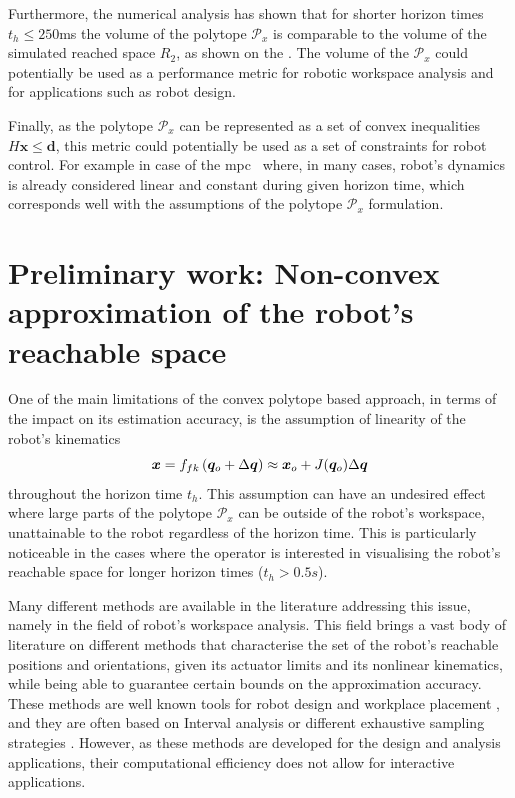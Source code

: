 Furthermore, the numerical analysis has shown that for shorter horizon times $t_h\leq250$ms the volume of the polytope $\mathcal{P}_x$ is comparable to the volume of the simulated reached space $R_2$, as shown on the . The volume of the $\mathcal{P}_x$ could potentially be used as a performance metric for robotic workspace analysis and for applications such as robot design.

Finally, as the polytope $\mathcal{P}_x$ can be represented as a set of convex inequalities $H\bm{x}\leq\bm{d}$, this metric could potentially be used as a set of constraints for robot control. For example in case of the \gls{mpc}~\cite{Kouvaritakis2016} where, in many cases, robot's dynamics is already considered linear and constant during given horizon time, which corresponds well with the assumptions of the polytope $\mathcal{P}_x$ formulation. 

\section{Preliminary work: Non-convex approximation of the robot's reachable space}
\label{ch:curved}
One of the main limitations of the convex polytope based approach, in terms of the impact on its estimation accuracy, is the assumption of linearity of the robot's kinematics $$\bm{x} = f_{fk}\left(\bm{q}_o + \Delta{\bm{q}}\right) \approx \bm{x}_o + J(\bm{q}_o)\Delta \bm{q}$$ throughout the horizon time $t_h$. This assumption can have an undesired effect where large parts of the polytope $\mathcal{P}_x$ can be outside of the robot's workspace, unattainable to the robot regardless of the horizon time. This is particularly noticeable in the cases where the operator is interested in visualising the robot's reachable space for longer horizon times ($t_h>0.5s$). 

Many different methods are available in the literature addressing this issue, namely in the field of robot's workspace analysis. This field brings a vast body of literature on different methods that characterise the set of the robot's reachable positions and orientations, given its actuator limits and its nonlinear kinematics, while being able to guarantee certain bounds on the approximation accuracy.
These methods are well known tools for robot design and workplace placement \cite{Gosselin1991Synthesis,kucuk2005robot}, and they are often based on Interval analysis \cite{gouttefarde2011interval} or different exhaustive sampling strategies \cite{Vahrenkamp2016}. However, as these methods are developed for the design and analysis applications, their computational efficiency does not allow for interactive applications. 

